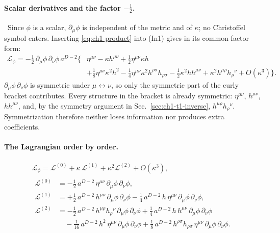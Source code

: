 \paragraph{Scalar derivatives and the factor $-\tfrac12$.} \tD\ Since $\phi$ is
a scalar, $\partial_\mu\phi$ is independent of the metric and of $\kappa$; no
Christoffel symbol enters. Inserting \eqref{eq:ch1-product} into (In1) gives
 in its common-factor form:
\begin{equation*}
\begin{aligned}\mathcal L_\phi=-\tfrac12\,\partial_\mu\phi\,\partial_\nu\phi\,a^{D-2}\Big\{&\eta^{\mu\nu}-\kappa h^{\mu\nu}+\tfrac12\eta^{\mu\nu}\kappa h\\
&+\tfrac18\eta^{\mu\nu}\kappa^2h^2-\tfrac14\eta^{\mu\nu}\kappa^2h^{\rho\sigma}h_{\rho\sigma}
-\tfrac12\kappa^2hh^{\mu\nu}+\kappa^2h^{\mu\rho}h_\rho{}^\nu+O(\kappa^3)\Big\}.\end{aligned}
\tag{I.6}\label{eq:ch1-eq6}
\end{equation*}
$\partial_\mu\phi\,\partial_\nu\phi$ is symmetric under $\mu\leftrightarrow\nu$,
so only the symmetric part of the curly bracket contributes. Every structure in
the bracket is already symmetric: $\eta^{\mu\nu}$, $h^{\mu\nu}$, $hh^{\mu\nu}$,
and, by the symmetry argument in Sec.~\ref{sec:ch1-t1-inverse},
$h^{\mu\rho}h_\rho{}^\nu$. Symmetrization therefore neither loses information
nor produces extra coefficients.

\paragraph{The Lagrangian order by order.} \tD
\begin{gather}
\mathcal L_\phi=\mathcal L^{(0)}+\kappa\,\mathcal L^{(1)}+\kappa^2\mathcal L^{(2)}+O(\kappa^3),
\label{eq:ch1-Lorders}\\
\begin{aligned}
\mathcal L^{(0)}&=-\tfrac12\,a^{D-2}\,\eta^{\mu\nu}\,\partial_\mu\phi\,\partial_\nu\phi,\\[2pt]
\mathcal L^{(1)}&=+\tfrac12\,a^{D-2}\,h^{\mu\nu}\,\partial_\mu\phi\,\partial_\nu\phi-\tfrac14\,a^{D-2}\,h\,\eta^{\mu\nu}\,\partial_\mu\phi\,\partial_\nu\phi,\\[2pt]
\mathcal L^{(2)}&=-\tfrac12\,a^{D-2}\,h^{\mu\rho}h_\rho{}^\nu\,\partial_\mu\phi\,\partial_\nu\phi+\tfrac14\,a^{D-2}\,h\,h^{\mu\nu}\,\partial_\mu\phi\,\partial_\nu\phi\\
&\quad-\tfrac1{16}\,a^{D-2}\,h^2\,\eta^{\mu\nu}\,\partial_\mu\phi\,\partial_\nu\phi+\tfrac18\,a^{D-2}\,h^{\rho\sigma}h_{\rho\sigma}\,\eta^{\mu\nu}\,\partial_\mu\phi\,\partial_\nu\phi .
\end{aligned}
\label{eq:ch1-L012}
\end{gather}

